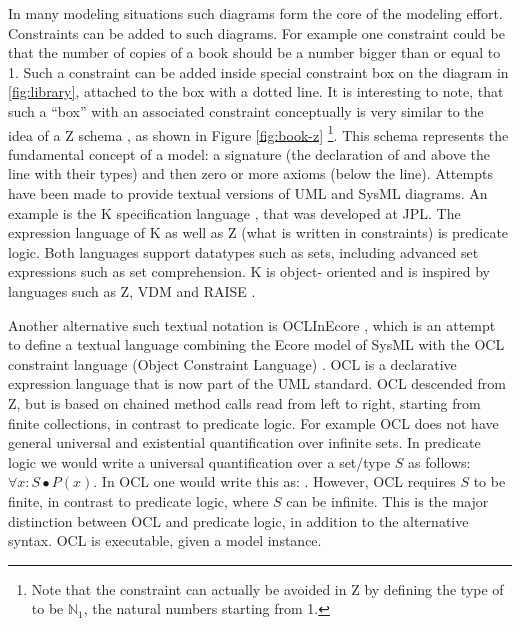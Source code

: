 In many modeling situations such diagrams form the core of the 
modeling effort. Constraints can be added to such diagrams.
For example one constraint could be that the number of copies of a 
book should be a number bigger than or equal to 1. Such a 
constraint can be added inside special constraint box on the 
diagram  in \ref{fig:library}, attached to the  box
with a dotted line. It is interesting to note, that such a ``box''
with an associated constraint conceptually is very similar to the 
idea of a Z schema \cite{?}, as shown in Figure \ref{fig:book-z}
\footnote{Note that the constraint can actually be avoided in Z by 
defining the type of  to be $\mathbb{N}_1$, the 
natural numbers starting from 1.}.
This schema represents the fundamental concept of a model: a 
signature (the declaration of  and  above 
the line with their types) and then zero or more axioms (below the 
line). 
%
Attempts have been made to provide textual versions of UML and 
SysML diagrams. An example is  the K specification language 
\cite{?}, that was developed at JPL. 
The expression language of K as well as Z 
(what is written in constraints) is predicate 
logic. Both languages support datatypes such as sets, including 
advanced set expressions such as set comprehension. K is object-
oriented and is inspired by languages  such as Z, VDM \cite{?} and 
RAISE \cite{?}. 

Another alternative such textual notation is OCLInEcore \cite{?}, 
which is an attempt 
to define a textual language combining the Ecore model
of SysML with the OCL constraint language (Object Constraint 
Language) 
\cite{?}. OCL is a declarative expression language that is now 
part of the UML 
standard. OCL descended from Z, but is based on chained method 
calls read from left to right, starting from finite collections, 
in contrast to predicate logic. For example OCL does not have
general universal and existential quantification over infinite 
sets. In predicate 
logic we would write a universal quantification over a set/type 
$S$ as follows: $\forall x : S \bullet P(x)$. In OCL one would 
write this as:
. However, OCL requires $S$ to be 
finite,
in contrast to predicate logic, where $S$ can be infinite. This
is the major distinction between OCL and predicate logic, in 
addition to the alternative syntax. OCL is executable, given
a model instance.



